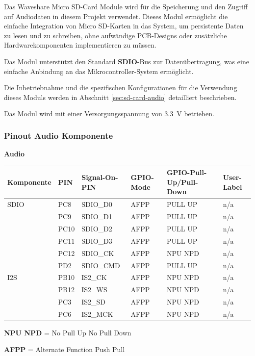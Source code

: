 Das Waveshare Micro SD-Card Module wird für die Speicherung und den Zugriff auf Audiodaten in diesem Projekt verwendet. Dieses Modul ermöglicht die einfache Integration von Micro SD-Karten in das System, um persistente Daten zu lesen und zu schreiben, ohne aufwändige PCB-Designs oder zusätzliche Hardwarekomponenten implementieren zu müssen.

Das Modul unterstützt den Standard \textbf{SDIO}-Bus zur Datenübertragung, was eine einfache Anbindung an das Mikrocontroller-System ermöglicht. 

Die Inbetriebnahme und die spezifischen Konfigurationen für die Verwendung dieses Moduls werden in Abschnitt \ref{sec:sd-card-audio} detailliert beschrieben. 

Das Modul wird mit einer Versorgungsspannung von \SI{3.3}{\volt} betrieben.

\newpage
\subsubsection{Pinout Audio Komponente}

\textbf{Audio}
\begin{longtable}[c]{|p{2.5cm}|p{1cm}|p{2.5cm}|p{2.5cm}|p{2.5cm}|p{3cm}|}
	\hline
	\textbf{Komponente} & \textbf{PIN} & \textbf{Signal-On-PIN} &  \textbf{GPIO-Mode} & \textbf{GPIO-Pull-Up/Pull-Down } & \textbf{User-Label}\\
	\hline
	SDIO & PC8 & SDIO\_D0 & AFPP & PULL UP & n/a \\
	\hline
	& PC9 & SDIO\_D1 & AFPP & PULL UP & n/a \\
	\hline
	& PC10 & SDIO\_D2 & AFPP & PULL UP & n/a \\
	\hline
	& PC11 & SDIO\_D3 & AFPP & PULL UP & n/a \\
	\hline
	& PC12 & SDIO\_CK & AFPP & NPU NPD & n/a \\
	\hline
	& PD2 & SDIO\_CMD & AFPP & PULL UP & n/a \\
	\hline
	I2S & PB10 & IS2\_CK & AFPP  & NPU NPD & n/a \\
	\hline
	& PB12 & IS2\_WS & AFPP & NPU NPD & n/a \\
	\hline
	& PC3 & IS2\_SD & AFPP & NPU NPD &  n/a \\
	\hline
	& PC6 & IS2\_MCK & AFPP & NPU NPD &  n/a \\
	\hline
\end{longtable}

\textbf{NPU NPD} = No Pull Up No Pull Down		

\textbf{AFPP} = Alternate Function Push Pull 

